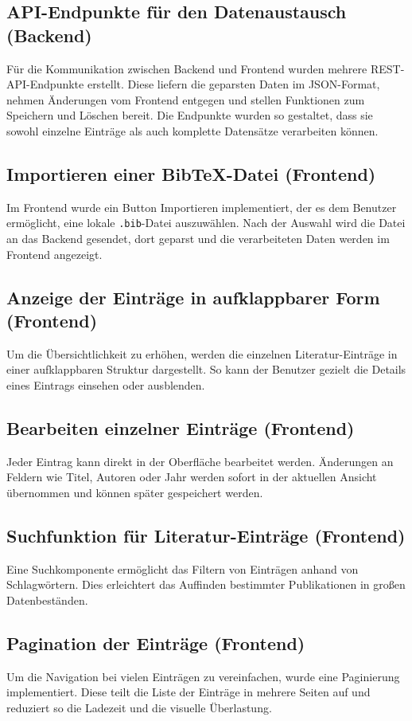 \subsection{API-Endpunkte für den Datenaustausch (Backend)}
Für die Kommunikation zwischen Backend und Frontend wurden mehrere REST-API-Endpunkte erstellt.
Diese liefern die geparsten Daten im JSON-Format, nehmen Änderungen vom Frontend entgegen und 
stellen Funktionen zum Speichern und Löschen bereit. Die Endpunkte wurden so gestaltet, dass sie
sowohl einzelne Einträge als auch komplette Datensätze verarbeiten können.

\subsection{Importieren einer BibTeX-Datei (Frontend)}
Im Frontend wurde ein Button \glqq Importieren\grqq{} implementiert,
der es dem Benutzer ermöglicht, eine lokale \texttt{.bib}-Datei auszuwählen.
Nach der Auswahl wird die Datei an das Backend gesendet, dort geparst und die verarbeiteten Daten werden im Frontend angezeigt.

\subsection{Anzeige der Einträge in aufklappbarer Form (Frontend)}
Um die Übersichtlichkeit zu erhöhen, werden die einzelnen Literatur-Einträge in 
einer aufklappbaren Struktur dargestellt. So kann der Benutzer gezielt die Details
eines Eintrags einsehen oder ausblenden.

\subsection{Bearbeiten einzelner Einträge (Frontend)}
Jeder Eintrag kann direkt in der Oberfläche bearbeitet werden.
Änderungen an Feldern wie Titel, Autoren oder Jahr werden sofort in der aktuellen Ansicht
übernommen und können später gespeichert werden.

\subsection{Suchfunktion für Literatur-Einträge (Frontend)}
Eine Suchkomponente ermöglicht das Filtern von Einträgen anhand von Schlagwörtern.
Dies erleichtert das Auffinden bestimmter Publikationen in großen Datenbeständen.

\subsection{Pagination der Einträge (Frontend)}
Um die Navigation bei vielen Einträgen zu vereinfachen, 
wurde eine Paginierung implementiert. Diese teilt die Liste der Einträge in
mehrere Seiten auf und reduziert so die Ladezeit und die visuelle Überlastung.

